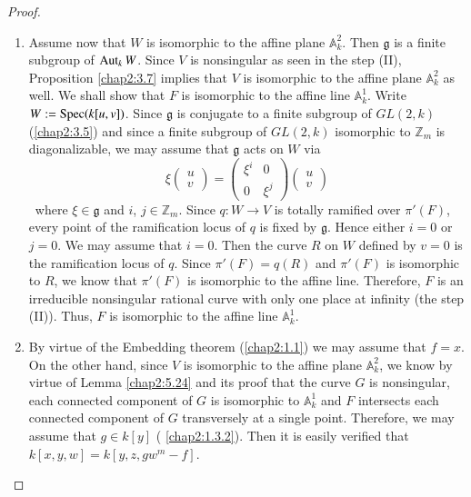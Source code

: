 \begin{proof}
\begin{enumerate}
\item Assume now that $W$ is isomorphic to the affine plane
  $\mathbb{A}^{2}_{k}$. Then $\mathfrak{g}$ is a finite subgroup of
  $\operatorname{Aut}_{k}W$. Since $V$ is nonsingular as seen in the step (II),
  Proposition \ref{chap2:3.7} implies that $V$ is isomorphic to the
  affine plane $\mathbb{A}^{2}_{k}$ as well. We shall show that $F$ is
  isomorphic to the affine line $\mathbb{A}^{1}_{k}$. Write
  $W:=\operatorname{Spec}(k[u,v])$. Since $\mathfrak{g}$ is conjugate to a finite
  subgroup of $GL(2,k)$ (\cf \ref{chap2:3.5}) and since a finite subgroup of
  $GL(2,k)$ isomorphic to $\mathbb{Z}_{m}$ is diagonalizable, we may
  assume that $\mathfrak{g}$ acts on $W$ via
$$
\xi
\begin{pmatrix}
u\\
v
\end{pmatrix}
=
\begin{pmatrix}
\xi^{i} & 0\\
0 & \xi^{j}
\end{pmatrix}
\begin{pmatrix}
u\\
v
\end{pmatrix}
$$\pageoriginale\
where $\xi\in\mathfrak{g}$ and $i$, $j\in\mathbb{Z}_{m}$. Since
$q:W\to V$ is totally ramified over $\pi'(F)$, every point of the
ramification locus of $q$ is fixed by $\mathfrak{g}$. Hence either
$i=0$ or $j=0$. We may assume that $i=0$. Then the curve $R$ on $W$
defined by $v=0$ is the ramification locus of $q$. Since
$\pi'(F)=q(R)$ and $\pi'(F)$ is isomorphic to $R$, we know that
$\pi'(F)$ is isomorphic to the affine line. Therefore, $F$ is an
irreducible nonsingular rational curve with only one place at infinity
(\cf the step (II)). Thus, $F$ is isomorphic to the affine line
$\mathbb{A}^{1}_{k}$. 

\item By virtue of the Embedding theorem (\cf \ref{chap2:1.1}) we may assume
  that $f=x$. On the other hand, since $V$ is isomorphic to the affine
  plane $\mathbb{A}^{2}_{k}$, we know by virtue of Lemma \ref{chap2:5.24}
  and its proof that the curve $G$ is nonsingular, each connected
  component of $G$ is isomorphic to $\mathbb{A}^{1}_{k}$ and $F$
  intersects each connected component of $G$ transversely at a single
  point. Therefore, we may assume that $g\in k[y]$ (\cf
  \ref{chap2:1.3.2}). Then it is easily verified that
  $k[x,y,w]=k[y,z,gw^{m}-f]$.
\end{enumerate}
\end{proof}

